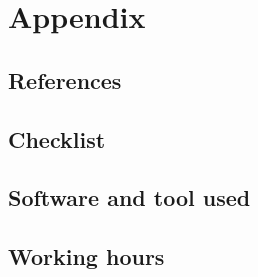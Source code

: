 \documentclass[]{report}
\begin{document}
\appendix

\chapter{Appendix}

\section{References}


\section{Checklist}


\section{Software and tool used}


\section{Working hours}

\end{document}
